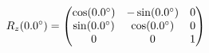 \documentclass[preview]{standalone}
\begin{document}
\begin{align*}
\special{dvisvgm:raw <g id='unique000'>}R_z(0.0^\circ) = \begin{pmatrix} \cos(0.0^\circ) & -\sin(0.0^\circ) & 0 \\ \sin(0.0^\circ) & \cos(0.0^\circ) & 0 \\ 0 & 0 & 1 \end{pmatrix}\special{dvisvgm:raw </g>}
\end{align*}
\end{document}
